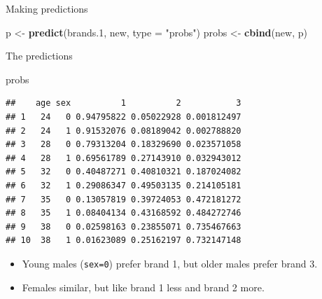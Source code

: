 \documentclass[ignorenonframetext,]{beamer}
\newenvironment{Shaded}{\begin{snugshade}}{\end{snugshade}}
\newcommand{\DataTypeTok}[1]{\textcolor[rgb]{0.13,0.29,0.53}{#1}}
\newcommand{\FloatTok}[1]{\textcolor[rgb]{0.00,0.00,0.81}{#1}}
\newcommand{\KeywordTok}[1]{\textcolor[rgb]{0.13,0.29,0.53}{\textbf{#1}}}
\newcommand{\NormalTok}[1]{#1}
\newcommand{\StringTok}[1]{\textcolor[rgb]{0.31,0.60,0.02}{#1}}
\begin{document}
\begin{frame}[fragile]{Making predictions}
\protect\hypertarget{making-predictions}{}

\begin{Shaded}
\begin{Highlighting}[]
\NormalTok{p <-}\StringTok{ }\KeywordTok{predict}\NormalTok{(brands}\FloatTok{.1}\NormalTok{, new, }\DataTypeTok{type =} \StringTok{"probs"}\NormalTok{)}
\NormalTok{probs <-}\StringTok{ }\KeywordTok{cbind}\NormalTok{(new, p)}
\end{Highlighting}
\end{Shaded}

\end{frame}

\begin{frame}[fragile]{The predictions}
\protect\hypertarget{the-predictions}{}

\begin{Shaded}
\begin{Highlighting}[]
\NormalTok{probs}
\end{Highlighting}
\end{Shaded}

\begin{verbatim}
##    age sex          1          2           3
## 1   24   0 0.94795822 0.05022928 0.001812497
## 2   24   1 0.91532076 0.08189042 0.002788820
## 3   28   0 0.79313204 0.18329690 0.023571058
## 4   28   1 0.69561789 0.27143910 0.032943012
## 5   32   0 0.40487271 0.40810321 0.187024082
## 6   32   1 0.29086347 0.49503135 0.214105181
## 7   35   0 0.13057819 0.39724053 0.472181272
## 8   35   1 0.08404134 0.43168592 0.484272746
## 9   38   0 0.02598163 0.23855071 0.735467663
## 10  38   1 0.01623089 0.25162197 0.732147148
\end{verbatim}

\begin{itemize}
\item
  Young males (\texttt{sex=0}) prefer brand 1, but older males prefer
  brand 3.
\item
  Females similar, but like brand 1 less and brand 2 more.
\end{itemize}

\end{frame}
\end{document}

